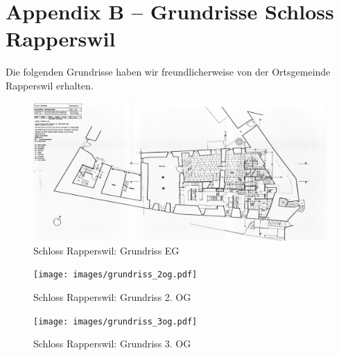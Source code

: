 \chapter{Appendix B -- Grundrisse Schloss Rapperswil}

\label{ch:groundplan}

Die folgenden Grundrisse haben wir freundlicherweise von der Ortsgemeinde
Rapperswil erhalten.

\begin{figure}[H]
	\centering
	\includegraphics[width=0.75\textheight,angle=90]{images/grundriss_eg.pdf}
	\caption{Schloss Rapperswil: Grundriss EG}
	\label{img:groundplan:eg}
\end{figure}

\begin{figure}[H]
	\centering
	\texttt{[image: images/grundriss\_2og.pdf]}
	\caption{Schloss Rapperswil: Grundriss 2. OG}
	\label{img:groundplan:2og}
\end{figure}

\begin{figure}[H]
	\centering
	\texttt{[image: images/grundriss\_3og.pdf]}
	\caption{Schloss Rapperswil: Grundriss 3. OG}
	\label{img:groundplan:3og}
\end{figure}
